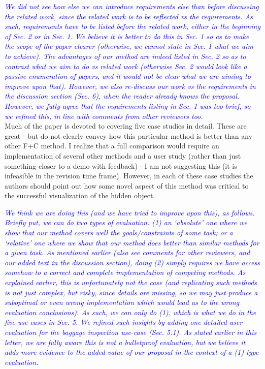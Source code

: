 \documentclass[a4paper,10pt]{article}
\newcommand{\rr}[1]{\emph{\textcolor{blue}{#1}}}
\begin{document}
    \rr{We did not see how else we can introduce requirements else than before discussing the related work, since the related work is to be reflected vs the requirements. As such, requirements have to be listed before the related work, either in the beginning of Sec. 2 or in Sec. 1. We believe it is better to do this in Sec. 1 so as to make the scope of the paper clearer (otherwise, we cannot state in Sec. 1 what we aim to achieve). The advantages of our method are indeed listed in Sec. 2 so as to contrast what we aim to do vs related work (otherwise Sec. 2 would look like a passive enumeration of papers, and it would not be clear what we are aiming to improve upon that). However, we also re-discuss our work vs the requirements in the discussion section (Sec. 6), when the reader already knows the proposal. However, we fully agree that the requirements listing in Sec. 1 was too brief, so we refined this, in line with comments from other reviewers too.}\\

    Much of the paper is devoted to covering five case studies in detail. These are
    great - but do not clearly convey how this particular method is better than any
    other F+C method. I realize that a full comparison would require an implementation
    of several other methods and a user study (rather than just something closer to a
    demo with feedback) - I am not suggesting this (it is infeasible in the revision
    time frame). However, in each of these case studies the authors should point out
    how some novel aspect of this method was critical to the successful visualization
    of the hidden object.
    
    \rr{We think we are doing this (and we have tried to improve upon this), as follows. Briefly put, we can do two types of evaluation: (1) an `absolute' one where we show that our method covers well the goals/constraints of some task; or a `relative' one where we show that our method does better than similar methods for a given task. As mentioned earlier (also see comments for other reviewers, and our added text in the discussion section), doing (2) simply requires we have access somehow to a correct and complete implementation of competing methods. As explained earlier, this is unfortunately not the case (and replicating such methods is not just complex, but risky, since details are missing, so we may just produce a suboptimal or even wrong implementation which would lead us to the wrong evaluation conclusions). As such, we can only do (1), which is what we do in the five use-cases in Sec. 5. We refined such insights by adding one detailed user evaluation for the baggage inspection use-case (Sec. 5.1). As stated earlier in this letter, we are fully aware this is not a bulletproof evaluation, but we believe it adds more evidence to the added-value of our proposal in the context of a (1)-type evaluation.}\\
\end{document}
